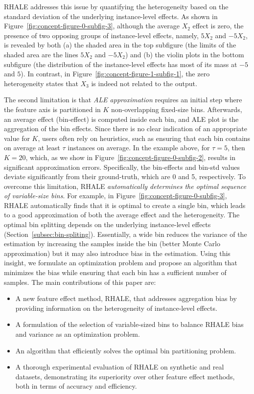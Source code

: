 \documentclass{ecai}  %
\begin{document}
RHALE addresses this issue by quantifying the heterogeneity based on
the standard deviation of the underlying instance-level effects. As
shown in Figure~\ref{fig:concept-figure-0-subfig-3}, although the
average \(X_2\) effect is zero, the presence of two opposing groups of
instance-level effects, namely, \(5X_2\) and \(-5X_2\), is revealed by
both (a) the shaded area in the top subfigure (the limits of the
shaded area are the lines \(5X_2\) and \(-5X_2\)) and (b) the violin
plots in the bottom subfigure (the distribution of the instance-level
effects has most of its mass at \(-5\) and \(5\)). In contrast, in
Figure~\ref{fig:concept-figure-1-subfig-1}, the zero heterogeneity
states that \(X_3\) is indeed not related to the output.

The second limitation is that \textit{ALE approximation} requires an
initial step where the feature axis is partitioned in \(K\)
non-overlapping fixed-size bins. Afterwards, an average effect
(bin-effect) is computed inside each bin, and ALE plot is the
aggregation of the bin effects. Since there is no clear indication of
an appropriate value for \(K\), users often rely on heuristics, such
as ensuring that each bin contains on average at least \(\tau\)
instances on average. In the example above, for \(\tau=5\), then
\(K = 20\), which, as we show in
Figure~\ref{fig:concept-figure-0-subfig-2}, results in significant
approximation errors. Specifically, the bin-effects and bin-std values
deviate significantly from their ground-truth, which are 0 and 5,
respectively. To overcome this limitation, RHALE \textit{automatically
  determines the optimal sequence of variable-size bins}. For example,
in Figure~\ref{fig:concept-figure-0-subfig-3}, RHALE automatically
finds that it is optimal to create a single bin, which leads to a good
approximation of both the average effect and the heterogeneity. The
optimal bin splitting depends on the underlying instance-level effects
(Section~\ref{subsec:bin-spliting}). Essentially, a wide bin reduces
the variance of the estimation by increasing the samples inside the bin
(better Monte Carlo approximation) but it may also introduce bias in
the estimation. Using this insight, we formulate an optimization
problem and propose an algorithm that minimizes the bias while
ensuring that each bin has a sufficient number of samples.
%
The main contributions of this paper are:

\begin{itemize}
\item A new feature effect method, RHALE, that addresses aggregation
  bias by providing information on the heterogeneity of instance-level
  effects.
\item A formulation of the selection of variable-sized bins to balance
  RHALE bias and variance as an optimization problem.
\item An algorithm that efficiently solves the optimal bin
  partitioning problem.
\item A thorough experimental evaluation of RHALE on synthetic and
  real datasets, demonstrating its superiority over other feature
  effect methods, both in terms of accuracy and efficiency.
\end{itemize}
\end{document}
